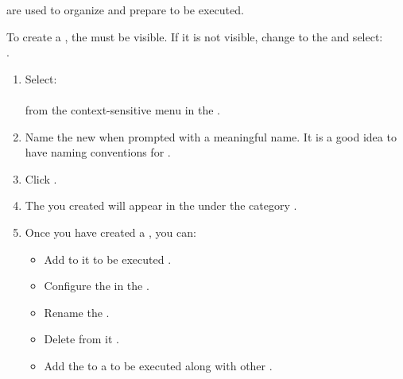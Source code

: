 
\gdsuites{} are used to organize and prepare \gdcases{} to be executed. 

To create a \gdsuite{}, the \gdtestsuitebrowser{} must be visible.
 If it is not visible, change to the \specpersp{} and select:\\
.

\begin{enumerate}
\item Select:\\
\\
from the context-sensitive menu in the \gdtestsuitebrowser{}. 

 \item Name  the new \gdsuite{} when prompted with a meaningful name. It is a good idea to have naming conventions  for \gdsuites{}. 
\item Click . 
\item The \gdsuite{} you created will appear in the \gdtestsuitebrowser{} under the category \bxname{\gdsuites{}}. 
\item Once you have created a \gdsuite{}, you can:
\begin{itemize}
\item Add \gdcases{} to it to be executed .
\item Configure the \gdsuite{} in the \gdpropview{} .
\item Rename the \gdsuite{} .
\item Delete \gdcases{} from it .
\item Add the \gdsuite{} to a \gdjob{} to be executed along with other \gdsuites{} .
\end{itemize}
\end{enumerate}



